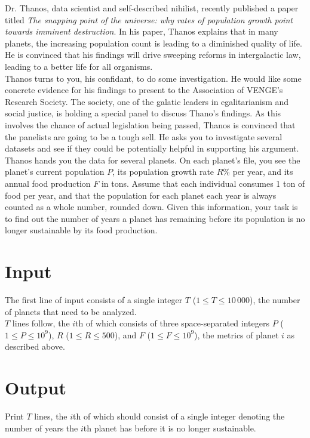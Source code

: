 
\noindent Dr. Thanos, data scientist and self-described nihilist, recently published a paper titled \textit{The snapping point of the universe: why rates of population growth point towards imminent destruction}. In his paper, Thanos explains that in many planets, the increasing population count is leading to a diminished quality of life. He is convinced that his findings will drive sweeping reforms in intergalactic law, leading to a better life for all organisms.\\

Thanos turns to you, his confidant, to do some investigation. He would like some concrete evidence for his findings to present to the Association of VENGE's Research Society. The society, one of the galatic leaders in egalitarianism and social justice, is holding a special panel to discuss Thano's findings. As this involves the chance of actual legislation being passed, Thanos is convinced that the panelists are going to be a tough sell. He asks you to investigate several datasets and see if they could be potentially helpful in supporting his argument.\\

Thanos hands you the data for several planets. On each planet's file, you see the planet's current population $P$, its population growth rate $R\%$ per year, and its annual food production $F$ in tons. Assume that each individual consumes 1 ton of food per year, and that the population for each planet each year is always counted as a whole number, rounded down. Given this information, your task is to find out the number of years a planet has remaining before its population is no longer sustainable by its food production.

\section*{Input}
The first line of input consists of a single integer $T$ ($1 \leq T \leq 10\,000$), the number of planets that need to be analyzed.\\
$T$ lines follow, the $i$th of which consists of three space-separated integers $P$ ($1 \leq P \leq 10^9$), $R$ ($1 \le R \le 500$), and $F$ ($1 \leq F \leq 10^9$), the metrics of planet $i$ as described above.

\section*{Output}
Print $T$ lines, the $i$th of which should consist of a single integer denoting the number of years the $i$th planet has before it is no longer sustainable.\\
